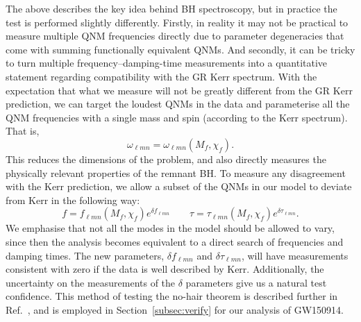 The above describes the key idea behind BH spectroscopy, but in practice the test is performed slightly differently.
Firstly, in reality it may not be practical to measure multiple QNM frequencies directly due to parameter degeneracies that come with summing functionally equivalent QNMs.
And secondly, it can be tricky to turn multiple frequency--damping-time measurements into a quantitative statement regarding compatibility with the GR Kerr spectrum.
With the expectation that what we measure will not be greatly different from the GR Kerr prediction, we can target the loudest QNMs in the data and parameterise all the QNM frequencies with a single mass and spin (according to the Kerr spectrum).
That is,
\begin{equation}
    \omega_{\ell m n} = \omega_{\ell m n}(M_f, \chi_f).
\end{equation}
This reduces the dimensions of the problem, and also directly measures the physically relevant properties of the remnant BH.
To measure any disagreement with the Kerr prediction, we allow a subset of the QNMs in our model to deviate from Kerr in the following way:
\begin{equation}
    f = f_{\ell m n}(M_f, \chi_f) e^{\delta f_{\ell m n}} \qquad \tau = \tau_{\ell m n}(M_f, \chi_f) e^{\delta \tau_{\ell m n}}.
\end{equation}
We emphasise that not all the modes in the model should be allowed to vary, since then the analysis becomes equivalent to a direct search of frequencies and damping times.
The new parameters, $\delta f_{\ell m n}$ and $\delta \tau_{\ell m n}$, will have measurements consistent with zero if the data is well described by Kerr.
Additionally, the uncertainty on the measurements of the $\delta$ parameters give us a natural test confidence. 
This method of testing the no-hair theorem is described further in Ref.~\cite{Isi:2021iql}, and is employed in Section~\ref{subsec:verify} for our analysis of GW150914.
